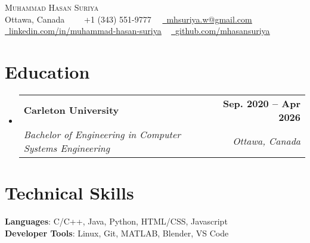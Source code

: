 \documentclass[letterpaper,11pt]{article}
\makeatletter
\newcommand{\resumeSubheading}[4]{
  \vspace{-2pt}\item
    \begin{tabular*}{1.0\textwidth}[t]{l@{\extracolsep{\fill}}r}
      \textbf{#1} & \textbf{\small #2} \\
      \textit{\small#3} & \textit{\small #4} \\
    \end{tabular*}\vspace{-7pt}
}
\newcommand{\resumeSubHeadingListStart}{\begin{itemize}[leftmargin=0.0in, label={}]}
\newcommand{\resumeSubHeadingListEnd}{\end{itemize}}
\makeatother
\begin{document}

\begin{center}
    {\Huge \scshape Muhammad Hasan Suriya} \\ \vspace{1pt}
    Ottawa, Canada \ \ \
    \raisebox{-0.1\height}\faPhone\ +1 (343) 551-9777 \ \textbullet \
    \href{mailto:mhsuriya.w@gmail.com}{\raisebox{-0.2\height}\faEnvelope\ \underline{mhsuriya.w@gmail.com}} \\
    \href{https://linkedin.com/in/muhammad-hasan-suriya/}{\raisebox{-0.2\height}\faLinkedin\ \underline{linkedin.com/in/muhammad-hasan-suriya}} ~
    \href{https://github.com/mhasansuriya}{\raisebox{-0.2\height}\faGithub\ \underline{github.com/mhasansuriya}} \\
    \vspace{-8pt}
\end{center}



\section{Education}
  \resumeSubHeadingListStart
    \resumeSubheading
      {Carleton University}{Sep. 2020 -- Apr 2026}
      {Bachelor of Engineering in Computer Systems Engineering}{Ottawa, Canada}
  \resumeSubHeadingListEnd

\section{Technical Skills}
\begin{itemize}[leftmargin=0.15in, label={}]
    \small{\item{
     \textbf{Languages}{: C/C++, Java, Python, HTML/CSS, Javascript} \\
     \textbf{Developer Tools}{: Linux, Git, MATLAB, Blender, VS Code} }}
\end{itemize}
\vspace{-16pt}
\end{document}
